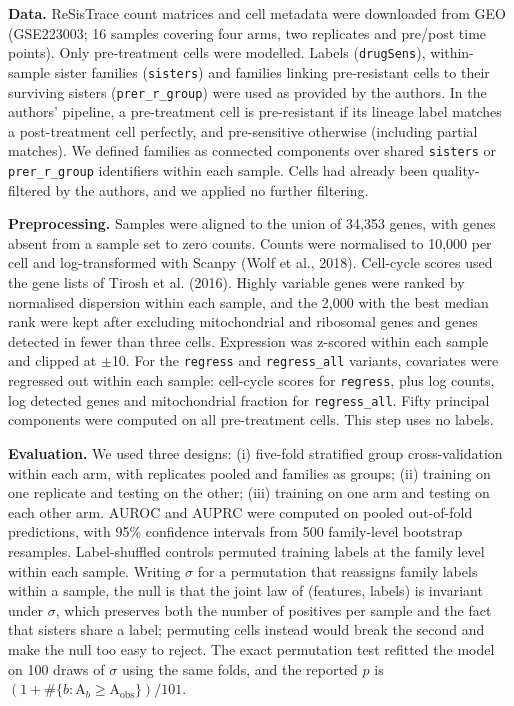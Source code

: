 \documentclass[11pt,a4paper]{article}
\begin{document}
\textbf{Data.} ReSisTrace count matrices and cell metadata were downloaded from GEO (GSE223003; 16 samples covering four arms, two replicates and pre/post time points). Only pre-treatment cells were modelled. Labels (\texttt{drugSens}), within-sample sister families (\texttt{sisters}) and families linking pre-resistant cells to their surviving sisters (\texttt{prer\_r\_group}) were used as provided by the authors. In the authors' pipeline, a pre-treatment cell is pre-resistant if its lineage label matches a post-treatment cell perfectly, and pre-sensitive otherwise (including partial matches). We defined families as connected components over shared \texttt{sisters} or \texttt{prer\_r\_group} identifiers within each sample. Cells had already been quality-filtered by the authors, and we applied no further filtering.

\textbf{Preprocessing.} Samples were aligned to the union of 34,353 genes, with genes absent from a sample set to zero counts. Counts were normalised to 10,000 per cell and log-transformed with Scanpy (Wolf et al., 2018). Cell-cycle scores used the gene lists of Tirosh et al. (2016). Highly variable genes were ranked by normalised dispersion within each sample, and the 2,000 with the best median rank were kept after excluding mitochondrial and ribosomal genes and genes detected in fewer than three cells. Expression was z-scored within each sample and clipped at $\pm$10. For the \texttt{regress} and \texttt{regress\_all} variants, covariates were regressed out within each sample: cell-cycle scores for \texttt{regress}, plus log counts, log detected genes and mitochondrial fraction for \texttt{regress\_all}. Fifty principal components were computed on all pre-treatment cells. This step uses no labels.

\textbf{Evaluation.} We used three designs: (i) five-fold stratified group cross-validation within each arm, with replicates pooled and families as groups; (ii) training on one replicate and testing on the other; (iii) training on one arm and testing on each other arm. AUROC and AUPRC were computed on pooled out-of-fold predictions, with 95\% confidence intervals from 500 family-level bootstrap resamples. Label-shuffled controls permuted training labels at the family level within each sample. Writing $\sigma$ for a permutation that reassigns family labels within a sample, the null is that the joint law of (features, labels) is invariant under $\sigma$, which preserves both the number of positives per sample and the fact that sisters share a label; permuting cells instead would break the second and make the null too easy to reject. The exact permutation test refitted the model on 100 draws of $\sigma$ using the same folds, and the reported $p$ is $(1 + \#\{b : \mathrm{A}_b \geq \mathrm{A}_{\text{obs}}\}) / 101$.
\end{document}
